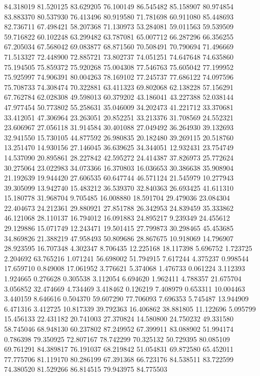 84.318019
81.520125
83.629205
76.100149
86.545482
85.158907
80.974854
83.883370
80.537930
76.413496
80.919580
71.781698
60.911080
85.448693
82.736711
67.498421
58.207368
71.130973
53.284081
59.011563
59.539509
59.716822
60.102248
63.299482
63.787081
65.007712
66.287296
66.356255
67.205034
67.568042
69.083877
68.871560
70.508491
70.790694
71.496669
71.513327
72.448900
72.885721
73.802737
74.051251
74.647648
74.635860
75.194505
75.859372
75.920268
75.004308
77.546763
75.605042
77.199952
75.925997
74.906391
80.004263
78.169102
77.245737
77.686122
74.097596
75.708733
74.308474
70.322881
63.411323
69.802068
62.138228
57.156291
67.762784
62.028308
49.598013
60.379202
43.186041
43.227388
52.038144
47.977454
50.773802
55.258631
35.046009
34.202473
41.221712
33.370681
33.412051
47.306964
23.263051
20.852251
33.213376
31.708569
24.552321
23.606967
27.056118
31.914584
30.401088
27.049492
36.264930
39.132693
32.941550
15.730105
44.877592
26.980835
20.182480
39.269115
20.518760
13.251470
14.930156
27.146045
36.639625
34.344051
12.932431
23.754749
14.537090
20.895861
28.227842
42.595272
24.414387
37.826973
25.772624
30.275064
23.022983
34.073366
16.370803
16.036653
30.386638
35.908904
21.192639
19.944420
27.606535
60.647744
46.571124
21.545979
10.277943
39.305099
13.942740
15.483212
36.539370
32.840363
26.693425
41.611310
15.180778
31.968704
9.705485
16.008880
18.591704
29.479036
23.084304
22.404673
24.212361
29.880921
27.851788
26.342953
24.839459
35.333862
46.121068
28.110137
16.794012
16.091883
24.895217
9.239349
24.455612
29.129886
15.071749
12.243471
19.501415
27.799873
30.298465
45.453685
34.869826
21.388219
47.958493
50.809686
28.867675
10.918069
14.796907
28.923595
16.707348
4.302347
8.706435
12.225168
18.117398
5.696752
1.723725
2.204692
63.765216
1.071241
56.698002
51.794915
7.617244
4.375237
0.998544
17.659710
0.849008
17.061952
3.776621
5.374068
1.476733
0.061224
3.112393
1.924665
0.276628
0.305538
3.112054
6.694620
1.962411
4.788357
21.675704
3.056852
32.474669
4.734469
3.418462
0.126219
7.408979
0.653311
10.004463
3.440159
8.646616
0.504370
59.607290
77.706093
7.696353
5.745487
13.944909
6.471316
3.412725
10.817339
39.792363
16.406862
38.881805
11.122696
5.095799
15.456133
22.431182
20.741003
27.370824
14.580800
24.750232
49.331580
58.745046
68.948130
60.237802
87.249952
67.399911
83.088902
51.994174
0.786398
79.350925
72.807167
78.742299
70.325132
50.729395
80.085109
69.761291
84.389817
76.191037
68.219842
51.054831
69.872580
65.452011
77.775706
81.119170
80.286199
67.391368
66.723176
84.538511
83.722599
74.380520
81.529266
86.814515
79.943975
84.775503
